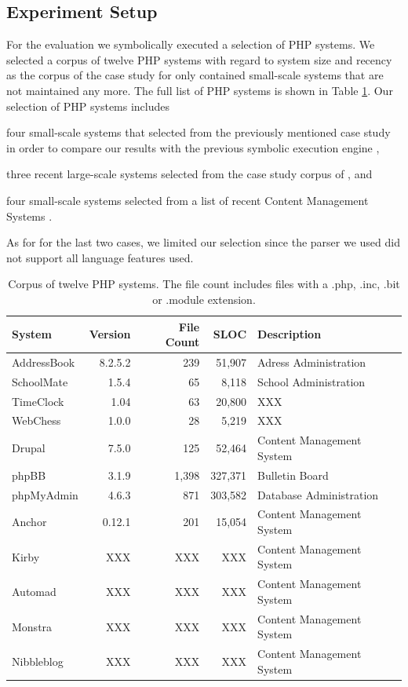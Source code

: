 \documentclass[preprint]{sig-alternate-05-2015}
\begin{document}
\subsection{Experiment Setup} 
For the evaluation we symbolically executed a selection of PHP systems. We selected a corpus of twelve PHP systems with regard to system size and recency as the corpus of the case study for \cite{Nguyen:2014:BCG:2635868.2635928} only contained small-scale systems that are not maintained any more. The full list of PHP systems is shown in Table \ref{corpus}. Our selection of PHP systems includes
\begin{compactitem}
\item four small-scale systems that selected from the previously mentioned case study in order to compare our results with the previous symbolic execution engine \cite{Nguyen:2014:BCG:2635868.2635928},
\item three recent large-scale systems selected from the case study corpus of \cite{Hills:2013:ESP:2483760.2483786}, and
\item four small-scale systems selected from a list of recent Content Management Systems \cite{codegeekz}.

\end{compactitem}
As for for the last two cases, we limited our selection since the parser we
used did not support all language features used.

\begin{table}[t]
\centering 
	\begin{tabular}{p{4cm}rrrl}
	\toprule
	\textbf{System} & \textbf{Version} & \textbf{File Count} & \textbf{SLOC} &
	\textbf{Description}
	\\
	\midrule
	AddressBook & 8.2.5.2 & 239 & 51,907 & Adress Administration \\
	SchoolMate & 1.5.4 & 65 & 8,118 & School Administration \\
	TimeClock & 1.04 & 63 & 20,800 & XXX \\
	WebChess & 1.0.0 & 28 & 5,219 & XXX \\
	\midrule
	Drupal & 7.5.0 & 125 & 52,464 & Content Management System \\
	phpBB & 3.1.9 & 1,398 & 327,371 & Bulletin Board \\
	phpMyAdmin & 4.6.3 & 871 & 303,582 & Database Administration \\
	\midrule
	Anchor & 0.12.1 & 201 & 15,054 & Content Management System \\
	Kirby & XXX & XXX & XXX & Content Management System \\
	Automad & XXX & XXX & XXX & Content Management System \\
	Monstra & XXX & XXX & XXX & Content Management System \\
	Nibbleblog & XXX & XXX & XXX & Content Management System \\
	\bottomrule
	\end{tabular}
	\caption{Corpus of twelve PHP systems. The file count includes files with a .php,
	.inc, .bit or .module extension.}
	\label{corpus}
\end{table}
\end{document}
